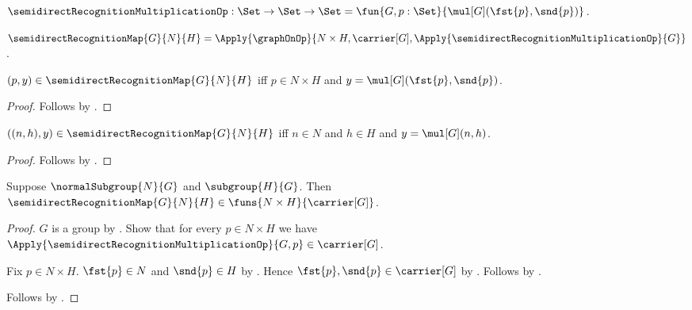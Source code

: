 \begin{definition}\label{semidirect_recognition_multiplication_op}
    $\semidirectRecognitionMultiplicationOp:\Set\to\Set\to\Set
        =\fun{G,p:\Set}{\mul[G](\fst{p},\snd{p})}$.
\end{definition}

\begin{definition}\label{semidirect_recognition_map}
    $\semidirectRecognitionMap{G}{N}{H}=
        \Apply{\graphOnOp}
            {N\times H,\carrier[G],
             \Apply{\semidirectRecognitionMultiplicationOp}{G}}$.
\end{definition}

\begin{proposition}\label{semidirect_recognition_map_iff}
    $(p,y)\in\semidirectRecognitionMap{G}{N}{H}$ iff
        $p\in N\times H$ and
        $y=\mul[G](\fst{p},\snd{p})$.
\end{proposition}
\begin{proof}
    Follows by
        .
\end{proof}

\begin{corollary}\label{semidirect_recognition_map_pair_iff}
    $((n,h),y)\in\semidirectRecognitionMap{G}{N}{H}$ iff
        $n\in N$ and $h\in H$ and $y=\mul[G](n,h)$.
\end{corollary}
\begin{proof}
    Follows by
        .
\end{proof}

\begin{proposition}\label{semidirect_recognition_map_type}
    Suppose $\normalSubgroup{N}{G}$ and $\subgroup{H}{G}$.
    Then $\semidirectRecognitionMap{G}{N}{H}\in
        \funs{N\times H}{\carrier[G]}$.
\end{proposition}
\begin{proof}
    $G$ is a group by .
    Show that for every $p\in N\times H$ we have
        $\Apply{\semidirectRecognitionMultiplicationOp}{G,p}\in
            \carrier[G]$.
    \begin{subproof}
        Fix $p\in N\times H$.
        $\fst{p}\in N$ and $\snd{p}\in H$ by
            .
        Hence $\fst{p},\snd{p}\in\carrier[G]$ by
            .
        Follows by
            .
    \end{subproof}
    Follows by
        .
\end{proof}


